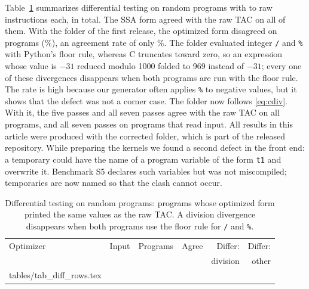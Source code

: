 \documentclass{ieeeaccess}
\makeatletter
\newcommand{\rowsfrom}[1]{\@@input #1 }
\makeatother
\begin{document}
Table~\ref{tab:diff} summarizes differential testing on \ndiffPrograms{} random programs with \ndiffMinInstr{} to \ndiffMaxInstr{} raw instructions each, \ndiffTotalInstr{} in total. The SSA form agreed with the raw TAC on all of them. With the folder of the first release, the optimized form disagreed on \ndiffReleasedDiffer{} programs (\ndiffReleasedRate\%), an agreement rate of only \ndiffReleasedAgree\%. The folder evaluated integer \texttt{/} and \texttt{\%} with Python's floor rule, whereas C truncates toward zero, so an expression whose value is $-31$ reduced modulo 1000 folded to 969 instead of $-31$; every one of these divergences disappears when both programs are run with the floor rule. The rate is high because our generator often applies \texttt{\%} to negative values, but it shows that the defect was not a corner case. The folder now follows \eqref{eq:cdiv}. With it, the five passes and all seven passes agree with the raw TAC on all \ndiffPrograms{} programs, and all seven passes on \ndiffInputPrograms{} programs that read input. All results in this article were produced with the corrected folder, which is part of the released repository. While preparing the kernels we found a second defect in the front end: a temporary could have the name of a program variable of the form \texttt{t1} and overwrite it. Benchmark S5 declares such variables but was not miscompiled; temporaries are now named so that the clash cannot occur.

\begin{table}[!t]
\centering
\caption{Differential testing on random programs: programs whose optimized form printed the same values as the raw TAC. A division divergence disappears when both programs use the floor rule for \texttt{/} and \texttt{\%}.}
\label{tab:diff}
\footnotesize
\setlength{\tabcolsep}{2.5pt}
\begin{tabular}{@{}p{30mm} c r r r r@{}}
\toprule
Optimizer & Input & Programs & Agree & Differ: & Differ: \\
 & & & & division & other \\
\midrule
\rowsfrom{tables/tab_diff_rows.tex}
\bottomrule
\end{tabular}
\end{table}
\end{document}
